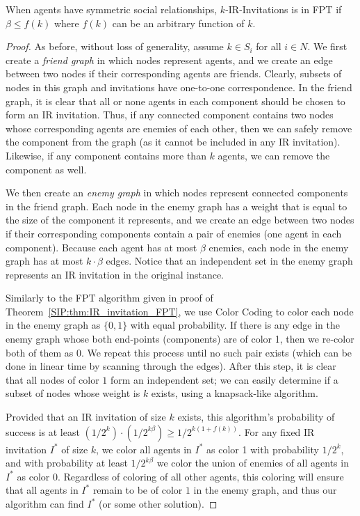 \begin{theorem} \label{SIP:thm:symmetric_IR_FPT}
	When agents have symmetric social relationships, 
	$k$-IR-Invitations is in FPT if $\beta \leq f(k)$ where $f(k)$ can be an arbitrary function of $k$. 
\end{theorem}
\begin{proof}
	As before, without loss of generality, assume $k\in S_i$ for all $i\in N$. 
	We first create a {\em friend graph} in which nodes represent agents, and we create an edge between two nodes if their corresponding agents are friends. Clearly, subsets of nodes in this graph and invitations have one-to-one correspondence.
	In the friend graph, it is clear that all or none agents in each component should be chosen to form an IR invitation. 
	Thus, if any connected component contains two nodes whose corresponding agents are enemies of each other, then we can safely remove the component from the graph (as it cannot be included in any IR invitation).
	Likewise, if any component contains more than $k$ agents, we can remove the component as well. 
	
	We then create an {\em enemy graph} in which nodes represent connected components in the friend graph. Each node in the enemy graph has a weight that is equal to the size of the component it represents, and we create an edge between two nodes if their corresponding components contain a pair of enemies (one agent in each component). Because each agent has at most $\beta$ enemies, each node in the enemy graph has at most $k\cdot \beta$ edges. 
	Notice that an independent set in the enemy graph represents an IR invitation in the original instance. 
		
	Similarly to the FPT algorithm given in proof of Theorem~\ref{SIP:thm:IR_invitation_FPT}, we use Color Coding to color each node in the enemy graph as $\{0,1\}$ with equal probability.
	If there is any edge in the enemy graph whose both end-points (components) are of color 1, then we re-color both of them as 0. We repeat this process until no such pair exists (which can be done in linear time by scanning through the edges). 
	After this step, it is clear that all nodes of color $1$ form an independent set; we can easily determine if a subset of nodes whose weight is $k$ exists, using a knapsack-like algorithm. 
	
	Provided that an IR invitation of size $k$ exists, this algorithm's probability of success is at least $(1/2^k) \cdot (1/2^{k\beta}) \geq 1/2^{k(1+f(k))}$. For any fixed IR invitation $I^*$ of size $k$, 
	we color all agents in $I^*$ as color 1 with probability $1/2^k$, and with probability at least $1/2^{k \beta}$ we color the union of enemies of all agents in $I^*$ as color $0$. Regardless of coloring of all other agents, this coloring will ensure that all agents in $I^*$ remain to be of color $1$ in the enemy graph, and thus our algorithm can find $I^*$ (or some other solution). 
	

\end{proof}
